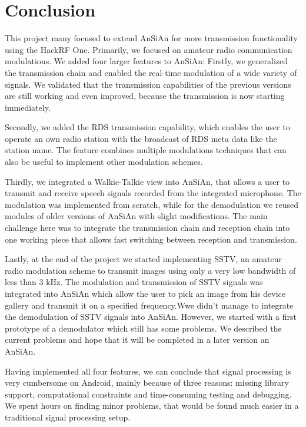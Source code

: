 \chapter{Conclusion}
This project many focused to extend \ac{AnSiAn} for more transmission functionality using the HackRF One. Primarily, we focused on amateur radio communication modulations. We added four larger features to \ac{AnSiAn}: Firstly, we generalized the transmission chain and enabled the real-time modulation of a wide variety of signals. We validated that the transmission capabilities of the previous versions are still working and even improved, because the transmission is now starting immediately. 

Secondly, we added the \ac{RDS} transmission capability, which enables the user to operate an own radio station with the broadcast of \ac{RDS} meta data like the station name. The feature combines multiple modulations techniques that can also be useful to implement other modulation schemes. 

Thirdly, we integrated a Walkie-Talkie view into \ac{AnSiAn}, that allows a user to transmit and receive speech signals recorded from the integrated microphone. The modulation was implemented from scratch, while for the demodulation we reused modules of older versions of \ac{AnSiAn} with slight modifications. The main challenge here was to integrate the transmission chain and reception chain into one working piece that allows fast switching between reception and transmission. 

Lastly, at the end of the project we started implementing \ac{SSTV}, an amateur radio modulation scheme to transmit images using only a very low bandwidth of less than 3 kHz. The modulation and transmission of \ac{SSTV} signals was integrated into \ac{AnSiAn} which allow the user to pick an image from his device gallery and transmit it on a specified frequency.Wwe didn't manage to integrate the demodulation of \ac{SSTV} signals into AnSiAn. However, we started with a first prototype of a demodulator which still has some problems. We described the current problems and hope that it will be completed in a later version an \ac{AnSiAn}.

Having implemented all four features, we can conclude that signal processing is very cumbersome on Android, mainly because of three reasons: missing library support, computational constraints and time-consuming testing and debugging. We spent hours on finding minor problems, that would be found much easier in a traditional signal processing setup.

